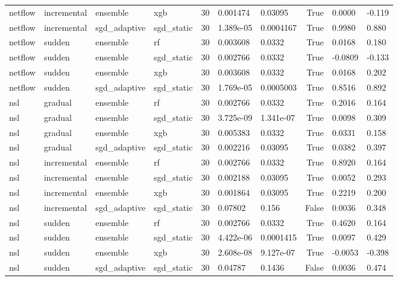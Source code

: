 \begin{tabular}{llllrllrll}
netflow & incremental & ensemble & xgb & 30 & 0.001474 & 0.03095 & True & 0.0000 & -0.119 \\
netflow & incremental & sgd\_adaptive & sgd\_static & 30 & 1.389e-05 & 0.0004167 & True & 0.9980 & 0.880 \\
netflow & sudden & ensemble & rf & 30 & 0.003608 & 0.0332 & True & 0.0168 & 0.180 \\
netflow & sudden & ensemble & sgd\_static & 30 & 0.002766 & 0.0332 & True & -0.0809 & -0.133 \\
netflow & sudden & ensemble & xgb & 30 & 0.003608 & 0.0332 & True & 0.0168 & 0.202 \\
netflow & sudden & sgd\_adaptive & sgd\_static & 30 & 1.769e-05 & 0.0005003 & True & 0.8516 & 0.892 \\
nsl & gradual & ensemble & rf & 30 & 0.002766 & 0.0332 & True & 0.2016 & 0.164 \\
nsl & gradual & ensemble & sgd\_static & 30 & 3.725e-09 & 1.341e-07 & True & 0.0098 & 0.309 \\
nsl & gradual & ensemble & xgb & 30 & 0.005383 & 0.0332 & True & 0.0331 & 0.158 \\
nsl & gradual & sgd\_adaptive & sgd\_static & 30 & 0.002216 & 0.03095 & True & 0.0382 & 0.397 \\
nsl & incremental & ensemble & rf & 30 & 0.002766 & 0.0332 & True & 0.8920 & 0.164 \\
nsl & incremental & ensemble & sgd\_static & 30 & 0.002188 & 0.03095 & True & 0.0052 & 0.293 \\
nsl & incremental & ensemble & xgb & 30 & 0.001864 & 0.03095 & True & 0.2219 & 0.200 \\
nsl & incremental & sgd\_adaptive & sgd\_static & 30 & 0.07802 & 0.156 & False & 0.0036 & 0.348 \\
nsl & sudden & ensemble & rf & 30 & 0.002766 & 0.0332 & True & 0.4620 & 0.164 \\
nsl & sudden & ensemble & sgd\_static & 30 & 4.422e-06 & 0.0001415 & True & 0.0097 & 0.429 \\
nsl & sudden & ensemble & xgb & 30 & 2.608e-08 & 9.127e-07 & True & -0.0053 & -0.398 \\
nsl & sudden & sgd\_adaptive & sgd\_static & 30 & 0.04787 & 0.1436 & False & 0.0036 & 0.474 \\
\bottomrule
\end{tabular}
